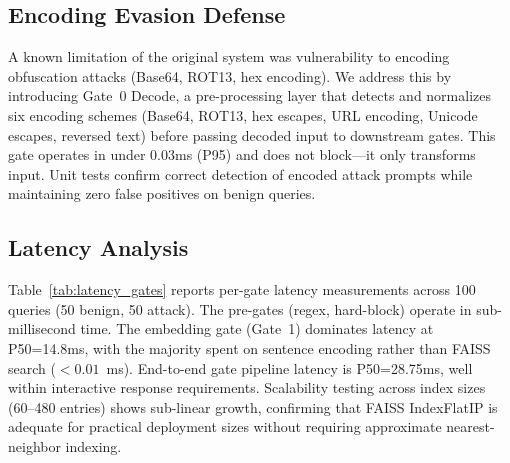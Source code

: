 \documentclass[journal]{IEEEtran}
\begin{document}
\subsection{Encoding Evasion Defense}
\label{Sect:Encoding}

A known limitation of the original system was vulnerability to encoding obfuscation attacks (Base64, ROT13, hex encoding). We address this by introducing Gate~0 Decode, a pre-processing layer that detects and normalizes six encoding schemes (Base64, ROT13, hex escapes, URL encoding, Unicode escapes, reversed text) before passing decoded input to downstream gates. This gate operates in under 0.03ms (P95) and does not block---it only transforms input. Unit tests confirm correct detection of encoded attack prompts while maintaining zero false positives on benign queries.

\subsection{Latency Analysis}
\label{Sect:Latency}

Table~\ref{tab:latency_gates} reports per-gate latency measurements across 100 queries (50 benign, 50 attack). The pre-gates (regex, hard-block) operate in sub-millisecond time. The embedding gate (Gate~1) dominates latency at P50=14.8ms, with the majority spent on sentence encoding rather than FAISS search ($<0.01$~ms). End-to-end gate pipeline latency is P50=28.75ms, well within interactive response requirements. Scalability testing across index sizes (60--480 entries) shows sub-linear growth, confirming that FAISS IndexFlatIP is adequate for practical deployment sizes without requiring approximate nearest-neighbor indexing.

\begin{table}[!t]
\centering
\caption{Per-Gate Latency Benchmark ($n{=}100$ queries, CPU inference)}
\label{tab:latency_gates}
\end{table}
\end{document}
